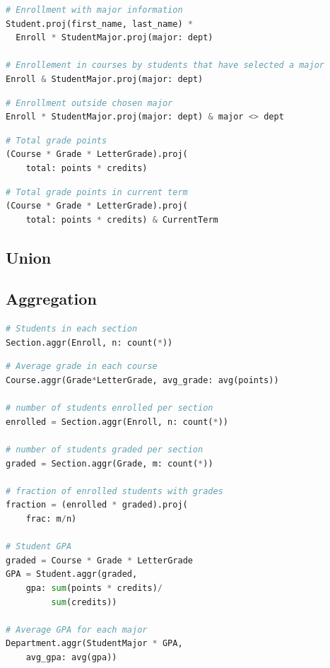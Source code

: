 \documentclass[letter,10pt]{article}
\begin{document}
\begin{lstlisting}[language=Python, caption={Renaming attributes.}, label={lst:rename}]
# Enrollment with major information
Student.proj(first_name, last_name) * 
  Enroll * StudentMajor.proj(major: dept)

# Enrollement in courses by students that have selected a major
Enroll & StudentMajor.proj(major: dept)
\end{lstlisting}

\begin{lstlisting}[language=Python, caption={Projection in composite expressions.}, label={lst:proj}]
# Enrollment outside chosen major
Enroll * StudentMajor.proj(major: dept) & major <> dept
\end{lstlisting}

\begin{lstlisting}[language=Python, caption={Extension: calculated attributes.}, label={lst:extend}]
# Total grade points
(Course * Grade * LetterGrade).proj(
    total: points * credits)
\end{lstlisting}

\begin{lstlisting}[language=Python, caption={}]
# Total grade points in current term
(Course * Grade * LetterGrade).proj(
    total: points * credits) & CurrentTerm
\end{lstlisting}

\subsection{Union}

\subsection{Aggregation}
\begin{lstlisting}[language=Python, caption={Calculate summary statistics.}, label={lst:aggr1}]
# Students in each section
Section.aggr(Enroll, n: count(*))
\end{lstlisting}

\begin{lstlisting}[language=Python, caption={Aggregation in expressions.}, label={lst:aggr2}]
# Average grade in each course
Course.aggr(Grade*LetterGrade, avg_grade: avg(points))

# number of students enrolled per section
enrolled = Section.aggr(Enroll, n: count(*))

# number of students graded per section
graded = Section.aggr(Grade, m: count(*))

# fraction of enrolled students with grades
fraction = (enrolled * graded).proj(
    frac: m/n)

# Student GPA
graded = Course * Grade * LetterGrade
GPA = Student.aggr(graded,
    gpa: sum(points * credits)/
         sum(credits))

# Average GPA for each major
Department.aggr(StudentMajor * GPA, 
    avg_gpa: avg(gpa))
\end{lstlisting}
\end{document}

